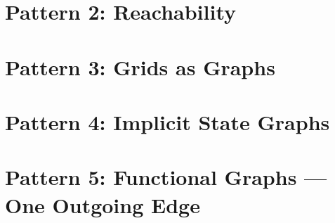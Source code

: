 \clearpage
\section{Pattern 2: Reachability}
\label{sec:ch1-p2}





\clearpage
\section{Pattern 3: Grids as Graphs}
\label{sec:ch1-p3}





\clearpage
\section{Pattern 4: Implicit State Graphs}
\label{sec:ch1-p4}





\clearpage
\section{Pattern 5: Functional Graphs --- One Outgoing Edge}
\label{sec:ch1-p5}






